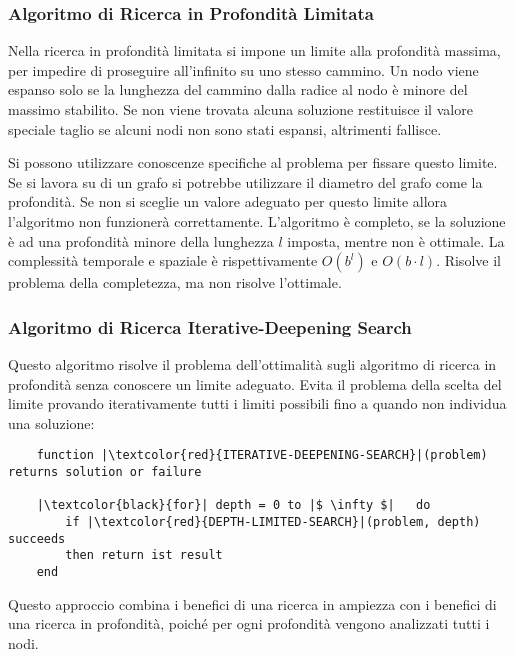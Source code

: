 \documentclass{article}
\numberwithin{equation}{subsection}
\begin{document}
\subsubsection{Algoritmo di Ricerca in Profondità Limitata}

Nella ricerca in profondità limitata si impone un limite alla profondità massima, per impedire 
di proseguire all'infinito su uno stesso cammino. Un nodo viene espanso solo se la lunghezza 
del cammino dalla radice al nodo è minore del massimo stabilito. Se non viene trovata 
alcuna soluzione restituisce il valore speciale taglio se alcuni nodi non sono stati espansi, 
altrimenti fallisce. 

Si possono utilizzare conoscenze specifiche al problema per fissare questo limite. Se si 
lavora su di un grafo si potrebbe utilizzare il diametro del grafo come la profondità. Se non 
si sceglie un valore adeguato per questo limite allora l'algoritmo non funzionerà correttamente. 
L'algoritmo è completo, se la soluzione è ad una profondità minore della lunghezza $l$ imposta, 
mentre non è ottimale. La complessità temporale e spaziale è rispettivamente $O(b^l)$ e $O(b\cdot l)$. 
Risolve il problema della completezza, ma non risolve l'ottimale.  

\subsubsection{Algoritmo di Ricerca Iterative-Deepening Search}

Questo algoritmo risolve il problema dell'ottimalità sugli algoritmo di ricerca in profondità 
senza conoscere un limite adeguato. Evita il problema della scelta del limite provando 
iterativamente tutti i limiti possibili fino a quando non individua una soluzione:
\begin{verbatim}
    function |\textcolor{red}{ITERATIVE-DEEPENING-SEARCH}|(problem) returns solution or failure

    |\textcolor{black}{for}| depth = 0 to |$ \infty $|   do
        if |\textcolor{red}{DEPTH-LIMITED-SEARCH}|(problem, depth) succeeds
        then return ist result
    end
\end{verbatim}

Questo approccio combina i benefici di una ricerca in ampiezza con i benefici di una ricerca 
in profondità, poiché per ogni profondità vengono analizzati tutti i nodi. 
\end{document}
